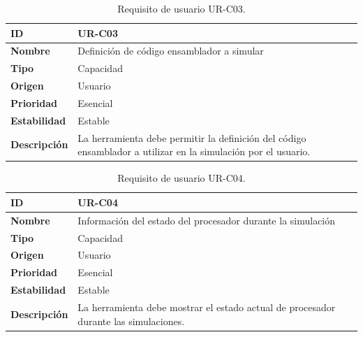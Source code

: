 \begin{center}
\begin{table}[htbp]
\centering
\begin{tabular}{@{}p{2.5cm} p{9cm}@{}} 
\toprule
\textbf{ID} 				& UR-C03 \\
\midrule
\textbf{Nombre} 			& Definición de código ensamblador a simular \\
\midrule
\textbf{Tipo} 			& Capacidad \\
\midrule
\textbf{Origen} 			& Usuario \\
\midrule
\textbf{Prioridad}		& Esencial \\
\midrule
\textbf{Estabilidad} 		& Estable \\
\midrule
\textbf{Descripción} 	& La herramienta debe permitir la definición del código ensamblador a utilizar en la simulación por el usuario. \\
\bottomrule
\end{tabular}
\caption{Requisito de usuario UR-C03.}
\label{tab:urc03}
\end{table}
\end{center}

\begin{center}
\begin{table}[htbp]
\centering
\begin{tabular}{@{}p{2.5cm} p{9cm}@{}} 
\toprule
\textbf{ID} 				& UR-C04 \\
\midrule
\textbf{Nombre} 			& Información del estado del procesador durante la simulación \\
\midrule
\textbf{Tipo} 			& Capacidad \\
\midrule
\textbf{Origen} 			& Usuario \\
\midrule
\textbf{Prioridad}		& Esencial \\
\midrule
\textbf{Estabilidad} 		& Estable \\
\midrule
\textbf{Descripción} 	& La herramienta debe mostrar el estado actual de procesador durante las simulaciones. \\
\bottomrule
\end{tabular}
\caption{Requisito de usuario UR-C04.}
\label{tab:urc04}
\end{table}
\end{center}

